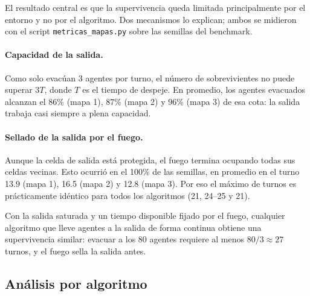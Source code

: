 \documentclass[11pt,a4paper]{article}
\begin{document}
El resultado central es que la supervivencia queda limitada principalmente por el entorno y no por el algoritmo. Dos mecanismos lo explican; ambos se midieron con el script \texttt{metricas\_mapas.py} sobre las semillas del benchmark.

\paragraph{Capacidad de la salida.} Como solo evacúan 3 agentes por turno, el número de sobrevivientes no puede superar $3T$, donde $T$ es el tiempo de despeje. En promedio, los agentes evacuados alcanzan el 86\% (mapa 1), 87\% (mapa 2) y 96\% (mapa 3) de esa cota: la salida trabaja casi siempre a plena capacidad.

\paragraph{Sellado de la salida por el fuego.} Aunque la celda de salida está protegida, el fuego termina ocupando todas sus celdas vecinas. Esto ocurrió en el 100\% de las semillas, en promedio en el turno 13.9 (mapa 1), 16.5 (mapa 2) y 12.8 (mapa 3). Por eso el máximo de turnos es prácticamente idéntico para todos los algoritmos (21, 24--25 y 21).

Con la salida saturada y un tiempo disponible fijado por el fuego, cualquier algoritmo que lleve agentes a la salida de forma continua obtiene una supervivencia similar: evacuar a los 80 agentes requiere al menos $80/3 \approx 27$ turnos, y el fuego sella la salida antes.

\subsection{Análisis por algoritmo}
\end{document}

